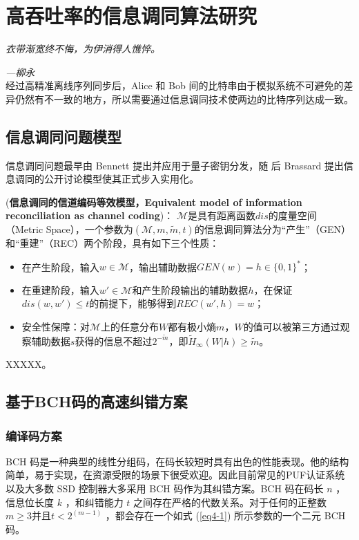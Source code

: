 \chapter{高吞吐率的信息调同算法研究}
\label{ch4}

\emph{\kaishu 衣带渐宽终不悔，为伊消得人憔悴。}

\emph{\kaishu \hfill ---柳永}\\

经过高精准离线序列同步后，Alice 和 Bob 间的比特串由于模拟系统不可避免的差异仍然有不一致的地方，所以需要通过信息调同技术使两边的比特序列达成一致。

\section{信息调同问题模型}
信息调同问题最早由 Bennett 提出并应用于量子密钥分发\cite{bennett1992experimental}，随
后 Brassard 提出信息调同的公开讨论模型使其正式步入实用化\cite{brassard1993secret}。



\begin{definition}{(\textbf{信息调同的信道编码等效模型，Equivalent model of information reconciliation as channel coding})：}
	$\mathcal{M}$是具有距离函数$dis$的度量空间（Metric Space），一个参数为$(\mathcal{M},m,\tilde{m},t)$的信息调同算法分为“产生”（GEN）和“重建”（REC）两个阶段，具有如下三个性质：
	\begin{itemize}
		\item 在产生阶段，输入$w\in \mathcal{M}$，输出辅助数据$GEN(w)=h\in \{0,1\}^*$；
		\item 在重建阶段，输入$w' \in \mathcal{M}$和产生阶段输出的辅助数据$h$，在保证$dis(w,w')\leq t$的前提下，能够得到$REC(w',h)=w$；
		\item 安全性保障：对$\mathcal{M}$上的任意分布$W$都有极小熵$m$，$W$的值可以被第三方通过观察辅助数据$s$获得的信息不超过$2^{-\tilde{m}}$，即$\tilde{H}_{\infty}(W|h)\geq \tilde{m}$。
	\end{itemize}
\end{definition}


XXXXX。

\section{基于BCH码的高速纠错方案}
\subsection{编译码方案}
BCH 码是一种典型的线性分组码，在码长较短时具有出色的性能表现。他的结构简单，易于实现，在资源受限的场景下很受欢迎。因此目前常见的PUF认证系统以及大多数 SSD 控制器大多采用 BCH 码作为其纠错方案。BCH 码在码长 $n$ ，信息位长度 $k$ ，和纠错能力 $t$ 之间存在严格的代数关系。对于任何的正整数 $m \geq 3$并且$t<2^{(m-1)}$ ，都会存在一个如式 (\ref{eq4-1}) 所示参数的一个二元 BCH 码。



